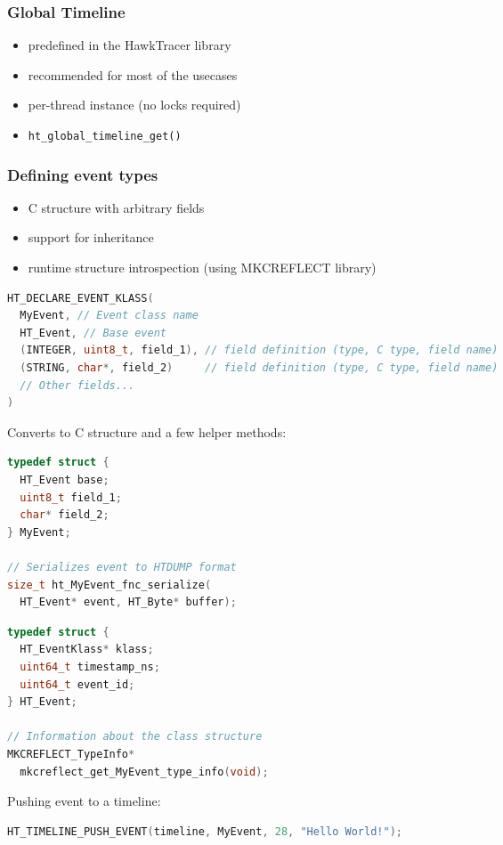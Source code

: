\documentclass{beamer}
\begin{document}
\begin{frame}[fragile]
  \frametitle{Global Timeline}
  \begin{itemize}
    \setlength\itemsep{0.4em}
    \item predefined in the HawkTracer library
    \item recommended for most of the usecases
    \item per-thread instance (no locks required)
    \item \lstinline{ht_global_timeline_get()}
  \end{itemize}

\end{frame}

\begin{frame}[fragile]
  \frametitle{Defining event types}
  \fontsize{9pt}{1}\selectfont
  \begin{itemize}
    \item C structure with arbitrary fields
    \item support for inheritance
    \item runtime structure introspection (using MKCREFLECT library)
  \end{itemize}
  \begin{lstlisting}[language=C++,basicstyle=\tiny]
HT_DECLARE_EVENT_KLASS(
  MyEvent, // Event class name
  HT_Event, // Base event
  (INTEGER, uint8_t, field_1), // field definition (type, C type, field name)
  (STRING, char*, field_2)     // field definition (type, C type, field name)
  // Other fields...
)
  \end{lstlisting}

  Converts to C structure and a few helper methods:
  \begin{multicols}{2}
    \begin{lstlisting}[language=C++,basicstyle=\tiny]
typedef struct {
  HT_Event base;
  uint8_t field_1;
  char* field_2;
} MyEvent;

// Serializes event to HTDUMP format
size_t ht_MyEvent_fnc_serialize(
  HT_Event* event, HT_Byte* buffer);
    \end{lstlisting}
    \columnbreak
    \begin{lstlisting}[language=C++,basicstyle=\tiny]
typedef struct {
  HT_EventKlass* klass;
  uint64_t timestamp_ns;
  uint64_t event_id;
} HT_Event;

// Information about the class structure
MKCREFLECT_TypeInfo*
  mkcreflect_get_MyEvent_type_info(void);
    \end{lstlisting}
  \end{multicols}
  \vspace{-0.7em}
  Pushing event to a timeline:
  \begin{lstlisting}[language=C++,basicstyle=\tiny]
  HT_TIMELINE_PUSH_EVENT(timeline, MyEvent, 28, "Hello World!");
  \end{lstlisting}

\end{frame}
\end{document}
